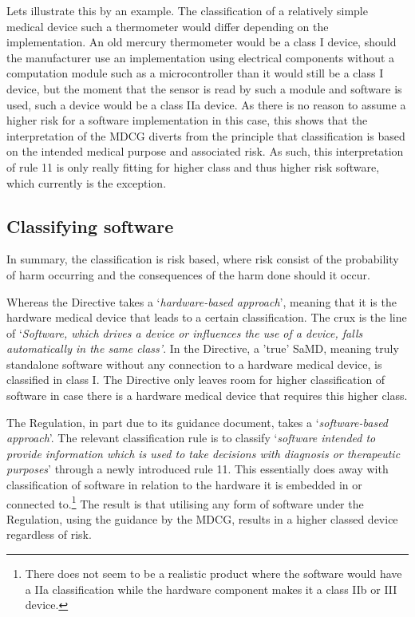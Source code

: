 \documentclass[
]{scrartcl}
\begin{document}
Lets illustrate this by an example. The classification of a relatively simple medical device such a thermometer would differ depending on the implementation. An old mercury thermometer would be a class I device, should the manufacturer use an implementation using electrical components without a computation module such as a microcontroller than it would still be a class I device, but the moment that the sensor is read by such a module and software is used, such a device would be a class IIa device. As there is no reason to assume a higher risk for a software implementation in this case, this shows that the interpretation of the MDCG diverts from the principle that classification is based on the intended medical purpose and associated risk. As such, this interpretation of rule 11 is only really fitting for higher class and thus higher risk software, which currently is the exception.

\hypertarget{classifying-software}{%
\subsection{Classifying software}\label{classifying-software}}

In summary, the classification is risk based, where risk consist of the probability of harm occurring and the consequences of the harm done should it occur.

Whereas the Directive takes a `\emph{hardware-based approach}', meaning that it is the hardware medical device that leads to a certain classification. The crux is the line of `\emph{Software, which drives a device or influences the use of a device, falls automatically in the same class'}. In the Directive, a 'true' SaMD, meaning truly standalone software without any connection to a hardware medical device, is classified in class I. The Directive only leaves room for higher classification of software in case there is a hardware medical device that requires this higher class.

The Regulation, in part due to its guidance document, takes a `\emph{software-based approach}'. The relevant classification rule is to classify `\emph{software intended to provide information which is used to take decisions with diagnosis or therapeutic purposes}' through a newly introduced rule 11. This essentially does away with classification of software in relation to the hardware it is embedded in or connected to.\footnote{There does not seem to be a realistic product where the software would have a IIa classification while the hardware component makes it a class IIb or III device.} The result is that utilising any form of software under the Regulation, using the guidance by the MDCG, results in a higher classed device regardless of risk.
\end{document}
